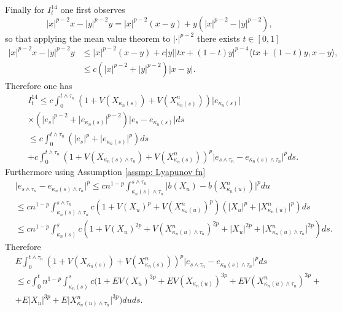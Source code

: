 \documentclass{article}
\begin{document}
Finally for $I^{14}_t$ one first observes
\begin{equation}
    \lvert x \rvert^{p-2}x-\lvert y \rvert^{p-2}y=\lvert x \rvert^{p-2}(x-y)+y(\lvert x \rvert^{p-2}-\lvert y \rvert^{p-2}),
\end{equation}
so that applying the mean value theorem to $\lvert \cdot \rvert^{p-2}$ there exists $t\in [0,1]$
\begin{align}
    \lvert x \rvert^{p-2}x-\lvert y \rvert^{p-2}y&\leq \lvert x \rvert^{p-2}( x-y)+c \lvert y\rvert \lvert tx+(1-t)y\rvert^{p-4}\langle tx+(1-t)y,x-y\rangle,\nonumber \\
    &\leq c( \lvert x \rvert^{p-2}+\lvert y \rvert ^{p-2})\lvert x-y\rvert.
\end{align}
Therefore one has
\begin{align}
   & I^{14}_t\leq c\int^{t\wedge \tau_n}_0 (1+V(X_{\kappa_n(s)})+V(X^n_{\kappa_n(s)}))\lvert e_{\kappa_n(s)} \rvert\nonumber \\
   &\times( \lvert e_s \rvert^{p-2}+\lvert e_{\kappa_n(s)} \rvert ^{p-2})\lvert e_s-e_{\kappa_n(s)}\rvert  ds \nonumber \\
   &\leq c\int^{t\wedge \tau_n}_0 ( \lvert e_s \rvert^p+\lvert e_{\kappa_n(s)} \rvert ^p) ds\nonumber \\
   &+c\int^{t\wedge \tau_n}_0 (1+V(X_{\kappa_n(s)\wedge \tau_n})+V(X^n_{\kappa_n(s)}))^p \lvert e_{s\wedge \tau_n}-e_{\kappa_n(s)\wedge \tau_n}\rvert^pds.
\end{align}
Furthermore using Assumption \ref{assmp: Lyapunov fn}
\begin{align}
&\lvert e_{s\wedge \tau_n}-e_{\kappa_n(s)\wedge \tau_n}\rvert^p \leq cn^{1-p}\int^{s\wedge \tau_n}_{\kappa_n(s)\wedge \tau_n}\lvert b(X_u)-b(X^n_{\kappa_n(u)})\rvert^p du\nonumber \\
&\leq cn^{1-p}\int^{s\wedge \tau_n}_{\kappa_n(s)\wedge \tau_n}c(1+V(X_u)^p+V(X^n_{\kappa_n(u)})^p)(\lvert X_u\rvert^p+\lvert X^n_{\kappa_n(u)}\rvert^p )ds\nonumber \\
&\leq cn^{1-p}\int^{s}_{\kappa_n(s)}c(1+V(X_{u})^{2p}+V(X^n_{\kappa_n(u)\wedge \tau_n})^{2p}+\lvert X_u\rvert^{2p}+\lvert X^n_{\kappa_n(u)\wedge \tau_n}\rvert^{2p} )ds.
\end{align}
Therefore
\begin{align}
 &E\int^{t\wedge \tau_n}_0 (1+V(X_{\kappa_n(s)})+V(X^n_{\kappa_n(s)}))^p \lvert e_{s\wedge \tau_n}-e_{\kappa_n(s)\wedge \tau_n}\rvert^pds   \nonumber \\
 &\leq c\int^t_0n^{1-p}\int^{s}_{\kappa_n(s)}c(1+EV(X_{u})^{3p}+EV(X_{\kappa_n(u)})^{3p}+EV(X^n_{\kappa_n(u)\wedge \tau_n})^{3p}+\nonumber \\
 &+E\lvert X_u\rvert^{3p}+E\lvert X^n_{\kappa_n(u)\wedge \tau_n}\rvert^{3p} )duds.
\end{align}
\end{document}
